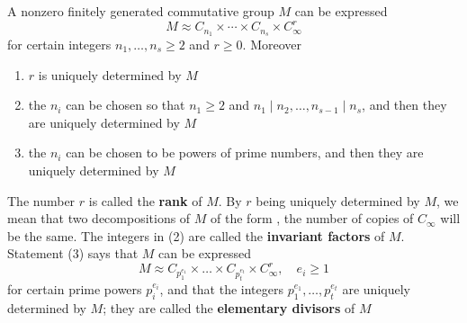 \documentclass[11pt]{article}
\begin{document}
\begin{theorem}[]
A nonzero finitely generated commutative group \(M\) can be expressed
\begin{equation*}
M\approx C_{n_1}\times\cdots\times C_{n_s}\times C_\infty^r
\end{equation*}
for certain integers \(n_1,\dots,n_s\ge 2\) and \(r\ge 0\). Moreover
\begin{enumerate}
\item \(r\) is uniquely determined by \(M\)
\item the \(n_i\) can be chosen so that \(n_1\ge 2\) and \(n_1\mid n_2,\dots,n_{s-1}\mid n_s\), and then they are
uniquely determined by \(M\)
\item the \(n_i\) can be chosen to be powers of prime numbers, and then they are uniquely determined
by \(M\)
\end{enumerate}
\end{theorem}

The number \(r\) is called the \textbf{rank} of \(M\). By \(r\) being uniquely determined by \(M\), we
mean that two decompositions of \(M\) of the form , the number of copies of \(C_\infty\) will be the
same. The integers in (2) are called the \textbf{invariant factors} of \(M\). Statement (3) says
that \(M\) can be expressed
\begin{equation*}
M\approx C_{p_1^{e_1}}\times\dots\times C_{p_t^{e_t}}\times C_\infty^r,\quad e_i\ge 1
\end{equation*}
for certain prime powers \(p_i^{e_i}\), and that the integers \(p_1^{e_1},\dots,p_t^{e_t}\) are uniquely
determined by \(M\); they are called the \textbf{elementary divisors} of \(M\)
\end{document}
